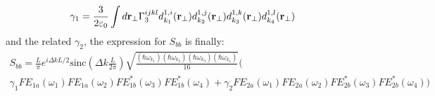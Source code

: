 \begin{equation}\gamma_1 = \frac{3}{2\varepsilon_0}\int d\mathbf{r}_\perp \Gamma^{ijkl}_3d^{1,i}_{k_1}(\mathbf{r}_{\perp})d^{1,j}_{k_2}(\mathbf{r}_{\perp})d^{1,k}_{k_3}(\mathbf{r}_{\perp})d^{1,l}_{k_4}(\mathbf{r}_{\perp})\end{equation}
and the related $\gamma_2$, the expression for $S_{bb}$ is finally:
\begin{multline}S_{bb} = \frac{L}{\pi}e^{i\Delta k L/2} \text{sinc}\left(\Delta k \frac{L}{2\pi}\right) \sqrt{\frac{(\hbar\omega_{k_1})(\hbar\omega_{k_2})(\hbar\omega_{k_3})(\hbar\omega_{k_4})}{16}}\Bigg(\\ \gamma_1 FE_{1a}(\omega_1)FE_{1a}(\omega_2)FE^*_{1b}(\omega_3)FE^*_{1b}(\omega_4) +\gamma_2 FE_{2a}(\omega_1)FE_{2a}(\omega_2)FE^*_{2b}(\omega_3)FE^*_{2b}(\omega_4)\Bigg)\end{multline}

